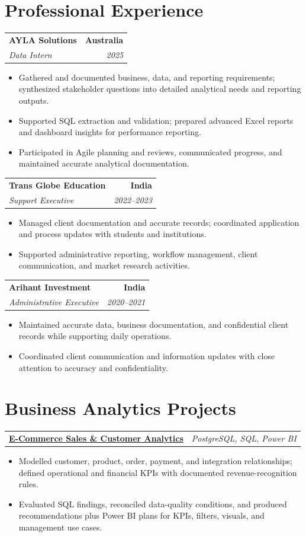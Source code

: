 \documentclass[letterpaper,10pt]{article}
\makeatletter
\newcommand{\role}[4]{%
  \begin{tabularx}{\textwidth}{@{}Xr@{}}
    \textbf{#1} & \textbf{#2} \\
    \textit{#3} & \textit{#4}
  \end{tabularx}\vspace{-1pt}
}
\newcommand{\project}[2]{%
  \begin{tabularx}{\textwidth}{@{}Xr@{}}
    \textbf{#1} & \textit{#2}
  \end{tabularx}\vspace{-1pt}
}
\makeatother
\begin{document}
\section{Professional Experience}
\role{AYLA Solutions}{Australia}{Data Intern}{2025}
\begin{itemize}
  \item Gathered and documented business, data, and reporting requirements; synthesized stakeholder questions into detailed analytical needs and reporting outputs.
  \item Supported SQL extraction and validation; prepared advanced Excel reports and dashboard insights for performance reporting.
  \item Participated in Agile planning and reviews, communicated progress, and maintained accurate analytical documentation.
\end{itemize}
\vspace{1pt}

\role{Trans Globe Education}{India}{Support Executive}{2022--2023}
\begin{itemize}
  \item Managed client documentation and accurate records; coordinated application and process updates with students and institutions.
  \item Supported administrative reporting, workflow management, client communication, and market research activities.
\end{itemize}
\vspace{1pt}

\role{Arihant Investment}{India}{Administrative Executive}{2020--2021}
\begin{itemize}
  \item Maintained accurate data, business documentation, and confidential client records while supporting daily operations.
  \item Coordinated client communication and information updates with close attention to accuracy and confidentiality.
\end{itemize}

\section{Business Analytics Projects}
\project{\href{https://github.com/jainalimehta/Ecommerce-Sales-Analytics}{E-Commerce Sales \& Customer Analytics}}{PostgreSQL, SQL, Power BI}
\begin{itemize}
  \item Modelled customer, product, order, payment, and integration relationships; defined operational and financial KPIs with documented revenue-recognition rules.
  \item Evaluated SQL findings, reconciled data-quality conditions, and produced recommendations plus Power BI plans for KPIs, filters, visuals, and management use cases.
\end{itemize}
\vspace{1pt}
\end{document}
